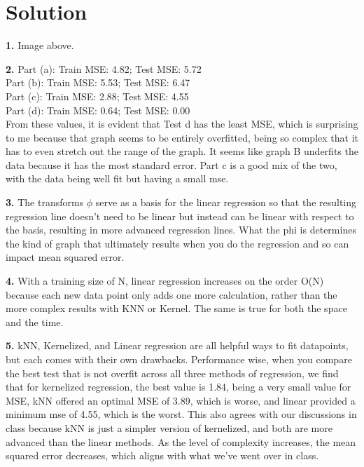 \documentclass[submit]{harvardml}
\newenvironment{solution}
  {\color{blue}\section*{Solution}}
{}
\begin{document}
\begin{solution}
  \textbf{1.} Image above.

  \textbf{2.} Part (a): Train MSE: 4.82; Test MSE: 5.72 \\ Part (b): Train MSE: 5.53; Test MSE: 6.47 \\
  Part (c): Train MSE: 2.88; Test MSE: 4.55 \\ Part (d): Train MSE: 0.64; Test MSE: 0.00 \\
  From these values, it is evident that Test d has the least MSE, which is surprising to me because that graph seems to be entirely overfitted, 
  being so complex that it has to even stretch out the range of the graph. It seems like graph B underfits the data because it has the most standard 
  error. Part c is a good mix of the two, with the data being well fit but having a small mse.

  \textbf{3.} The transforms $\phi$ serve as a basis for the linear regression so that the resulting regression line doesn't need to be linear
  but instead can be linear with respect to the basis, resulting in more advanced regression lines. What the phi is determines the kind of 
  graph that ultimately results when you do the regression and so can impact mean squared error. 

  \textbf{4.} With a training size of N, linear regression increases on the order O(N) because each new data point only adds one more calculation,
  rather than the more complex results with KNN or Kernel. The same is true for both the space and the time. 

  \textbf{5.} kNN, Kernelized, and Linear regression are all helpful ways to fit datapoints, but each comes with their own drawbacks. Performance wise, 
  when you compare the best test that is not overfit across all three methods of regression, we find that for kernelized regression, the best value is 1.84, 
  being a very small value for MSE, kNN offered an optimal MSE of 3.89, which is worse, and linear provided a minimum mse of 4.55, which is the worst. 
  This also agrees with our discussions in class because kNN is just a simpler version of kernelized, and both are more advanced than the linear methods. 
  As the level of complexity increases, the mean squared error decreases, which aligns with what we've went over in class. 
 
\end{solution}

\newpage
\end{document}
